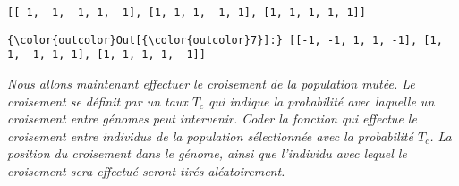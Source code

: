 \documentclass[11pt]{article}
\begin{document}
    \begin{Verbatim}[commandchars=\\\{\}]
[[-1, -1, -1, 1, -1], [1, 1, 1, -1, 1], [1, 1, 1, 1, 1]]

    \end{Verbatim}

\begin{Verbatim}[commandchars=\\\{\}]
{\color{outcolor}Out[{\color{outcolor}7}]:} [[-1, -1, 1, 1, -1], [1, 1, -1, 1, 1], [1, 1, 1, 1, -1]]
\end{Verbatim}
            
    \emph{Nous allons maintenant effectuer le croisement de la population
mutée. Le croisement se définit par un taux \(T_c\) qui indique la
probabilité avec laquelle un croisement entre génomes peut intervenir.
Coder la fonction qui effectue le croisement entre individus de la
population sélectionnée avec la probabilité \(T_c\). La position du
croisement dans le génome, ainsi que l'individu avec lequel le
croisement sera effectué seront tirés aléatoirement.}
\end{document}
